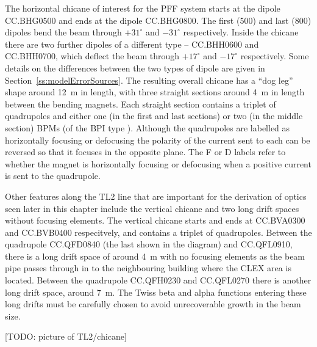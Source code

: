 The horizontal chicane of interest for the PFF system starts at the dipole CC.BHG0500 and ends at the dipole CC.BHG0800. The first (500) and last (800) dipoles bend the beam through \(+31^\circ\) and \(-31^\circ\) respectively. Inside the chicane there are two further dipoles of a different type -- CC.BHH0600 and CC.BHH0700, which deflect the beam through \(+17^\circ\) and \(-17^\circ\) respectively. Some details on the differences between the two types of dipole are given in Section~\ref{ss:modelErrorSources}. The resulting overall chicane has a ``dog leg'' shape around 12~m in length, with three straight sections around 4~m in length between the bending magnets. Each straight section contains a triplet of quadrupoles and either one (in the first and last sections) or two (in the middle section) BPMs (of the BPI type \cite{bpi}). Although the quadrupoles are labelled as horizontally focusing or defocusing the polarity of the current sent to each can be reversed so that it focuses in the opposite plane. The F or D labels refer to whether the magnet is horizontally focusing or defocusing when a positive current is sent to the quadrupole.

Other features along the TL2 line that are important for the derivation of optics seen later in this chapter include the vertical chicane and two long drift spaces without focusing elements. The vertical chicane starts and ends at CC.BVA0300 and CC.BVB0400 respecitvely, and contains a triplet of quadrupoles. Between the quadrupole CC.QFD0840 (the last shown in the diagram) and CC.QFL0910, there is a long drift space of around 4~m with no focusing elements as the beam pipe passes through in to the neighbouring building where the CLEX area is located. Between the quadrupole CC.QFH0230 and CC.QFL0270 there is another long drift space, around 7~m. The Twiss beta and alpha functions entering these long drifts must be carefully chosen to avoid unrecoverable growth in the beam size.

[TODO: picture of TL2/chicane]


